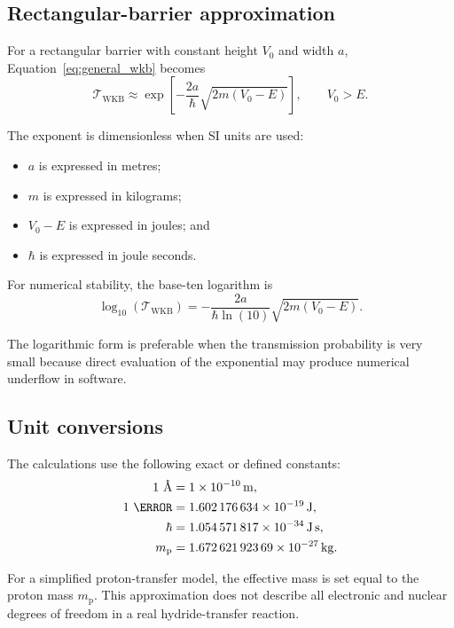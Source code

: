 \documentclass[11pt,a4paper]{article}
\newcommand{\WKB}{\mathrm{WKB}}
\newcommand{\trans}{\mathcal{T}}
\newcommand{\angstromunit}{\text{\AA}}
\begin{document}
\subsection{Rectangular-barrier approximation}

For a rectangular barrier with constant height $V_0$ and width $a$,
Equation~\eqref{eq:general_wkb} becomes
\begin{equation}
\trans_{\WKB}
\approx
\exp\left[
-\frac{2a}{\hbar}
\sqrt{2m\left(V_0-E\right)}
\right],
\qquad V_0>E.
\label{eq:rectangular_wkb}
\end{equation}

The exponent is dimensionless when SI units are used:
\begin{itemize}[leftmargin=2em]
    \item $a$ is expressed in metres;
    \item $m$ is expressed in kilograms;
    \item $V_0-E$ is expressed in joules; and
    \item $\hbar$ is expressed in joule seconds.
\end{itemize}

For numerical stability, the base-ten logarithm is
\begin{equation}
\log_{10}\left(\trans_{\WKB}\right)
=
-\frac{2a}{\hbar\ln(10)}
\sqrt{2m\left(V_0-E\right)}.
\label{eq:log_wkb}
\end{equation}

The logarithmic form is preferable when the transmission probability is very
small because direct evaluation of the exponential may produce numerical
underflow in software.

\subsection{Unit conversions}

The calculations use the following exact or defined constants:
\begin{align}
1~\angstromunit
&=
\SI{1e-10}{\metre},\\
1~\electronvolt
&=
\SI{1.602176634e-19}{\joule},\\
\hbar
&=
\SI{1.054571817e-34}{\joule\second},\\
m_{\mathrm{p}}
&=
\SI{1.67262192369e-27}{\kilogram}.
\end{align}

For a simplified proton-transfer model, the effective mass is set equal to the
proton mass $m_{\mathrm{p}}$. This approximation does not describe all
electronic and nuclear degrees of freedom in a real hydride-transfer reaction.
\end{document}
